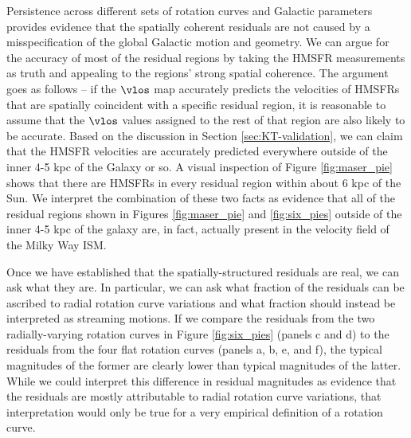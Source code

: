 Persistence across different sets of rotation curves and Galactic parameters provides evidence that the spatially coherent residuals are not caused by a misspecification of the global Galactic motion and geometry.
We can argue for the accuracy of most of the residual regions by taking the HMSFR measurements as truth and appealing to the regions' strong spatial coherence.
The argument goes as follows -- if the $\vlos$ map accurately predicts the velocities of HMSFRs that are spatially coincident with a specific residual region, it is reasonable to assume that the $\vlos$ values assigned to the rest of that region are also likely to be accurate. 
Based on the discussion in Section \ref{sec:KT-validation}, we can claim that the HMSFR velocities are accurately predicted everywhere outside of the inner 4-5 kpc of the Galaxy or so.
A visual inspection of Figure \ref{fig:maser_pie} shows that there are HMSFRs in every residual region within about 6 kpc of the Sun. 
We interpret the combination of these two facts as evidence that all of the residual regions shown in Figures \ref{fig:maser_pie} and \ref{fig:six_pies} outside of the inner 4-5 kpc of the galaxy are, in fact, actually present in the velocity field of the Milky Way ISM. 

Once we have established that the spatially-structured residuals are real, we can ask what they are.
In particular, we can ask what fraction of the residuals can be ascribed to radial rotation curve variations and what fraction should instead be interpreted as streaming motions. 
If we compare the residuals from the two radially-varying rotation curves in Figure \ref{fig:six_pies} (panels c and d) to the residuals from the four flat rotation curves (panels a, b, e, and f), the typical magnitudes of the former are clearly lower than typical magnitudes of the latter. 
While we could interpret this difference in residual magnitudes as evidence that the residuals are mostly attributable to radial rotation curve variations, that interpretation would only be true for a very empirical definition of a rotation curve.

